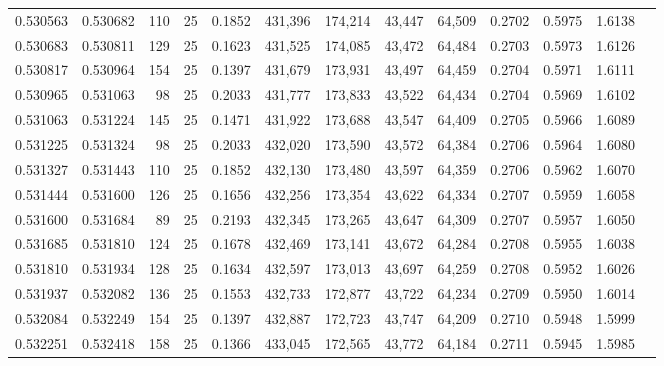 \begin{tabular}{rrrrrrrrrrrrr}
0.530563 & 0.530682 &   110 &  25 &                                     0.1852 & 431,396 & 174,214 &  43,447 &  64,509 & 0.2702 & 0.5975 & 1.6138 \\
0.530683 & 0.530811 &   129 &  25 &                                     0.1623 & 431,525 & 174,085 &  43,472 &  64,484 & 0.2703 & 0.5973 & 1.6126 \\
0.530817 & 0.530964 &   154 &  25 &                                     0.1397 & 431,679 & 173,931 &  43,497 &  64,459 & 0.2704 & 0.5971 & 1.6111 \\
0.530965 & 0.531063 &    98 &  25 &                                     0.2033 & 431,777 & 173,833 &  43,522 &  64,434 & 0.2704 & 0.5969 & 1.6102 \\
0.531063 & 0.531224 &   145 &  25 &                                     0.1471 & 431,922 & 173,688 &  43,547 &  64,409 & 0.2705 & 0.5966 & 1.6089 \\
0.531225 & 0.531324 &    98 &  25 &                                     0.2033 & 432,020 & 173,590 &  43,572 &  64,384 & 0.2706 & 0.5964 & 1.6080 \\
0.531327 & 0.531443 &   110 &  25 &                                     0.1852 & 432,130 & 173,480 &  43,597 &  64,359 & 0.2706 & 0.5962 & 1.6070 \\
0.531444 & 0.531600 &   126 &  25 &                                     0.1656 & 432,256 & 173,354 &  43,622 &  64,334 & 0.2707 & 0.5959 & 1.6058 \\
0.531600 & 0.531684 &    89 &  25 &                                     0.2193 & 432,345 & 173,265 &  43,647 &  64,309 & 0.2707 & 0.5957 & 1.6050 \\
0.531685 & 0.531810 &   124 &  25 &                                     0.1678 & 432,469 & 173,141 &  43,672 &  64,284 & 0.2708 & 0.5955 & 1.6038 \\
0.531810 & 0.531934 &   128 &  25 &                                     0.1634 & 432,597 & 173,013 &  43,697 &  64,259 & 0.2708 & 0.5952 & 1.6026 \\
0.531937 & 0.532082 &   136 &  25 &                                     0.1553 & 432,733 & 172,877 &  43,722 &  64,234 & 0.2709 & 0.5950 & 1.6014 \\
0.532084 & 0.532249 &   154 &  25 &                                     0.1397 & 432,887 & 172,723 &  43,747 &  64,209 & 0.2710 & 0.5948 & 1.5999 \\
0.532251 & 0.532418 &   158 &  25 &                                     0.1366 & 433,045 & 172,565 &  43,772 &  64,184 & 0.2711 & 0.5945 & 1.5985 \\

\end{tabular}

